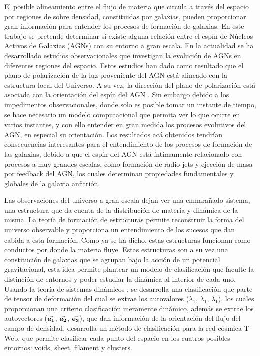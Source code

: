 El posible alineamiento entre el flujo de materia que circula a través del espacio por regiones de sobre densidad, constituidas por galaxias, pueden proporcionar gran información para entender los procesos de formación de galaxias. En este trabajo se pretende determinar si existe alguna relación entre el espín de Núcleos Activos de Galaxias (AGNs) con su entorno a gran escala. En la actualidad se ha desarrollado estudios observacionales que investigan la evolución de AGNs en diferentes regiones del espacio. Estos estudios han dado como resultado que el plano de polarización de la luz proveniente del AGN está alineado con la estructura local del Universo. A su vez, la dirección del plano de polarización está asociada con la orientación del espín del AGN \cite{hutsemekers2014}. Sin embargo debido a los impedimentos observacionales, donde solo es posible tomar un instante de tiempo, se hace necesario un modelo computacional que permita ver lo que ocurre en varios instantes, y con ello entender en gran medida los procesos evolutivos del AGN, en especial su orientación. Los resultados acá obtenidos tendrían consecuencias interesantes para el entendimiento de los procesos de formación de las galaxias, debido a que el espín del AGN está íntimamente relacionado con procesos a muy grandes escalas, como formación de radio jets y ejección de masa por feedback del AGN, los cuales determinan propiedades fundamentales y globales de la galaxia anfitrión. 


Las observaciones del universo a gran escala dejan ver una enmarañado sistema, una estructura que da cuenta de la distribución de materia y dinámica de la misma. La teoría de formación de estructuras \cite{zeldovich1970} permite reconstruir la forma del universo observable y proporciona un entendimiento de los sucesos que dan cabida a esta formación. Como ya se ha dicho, estas estructuras funcionan como conductos por donde la materia fluye. Estas estructuras son a su vez una constitución de galaxias que se agrupan bajo la acción de un potencial gravitacional, esta idea permite plantear un modelo de clasificación que faculte la distinción de entornos y poder estudiar la dinámica al interior de cada uno. Usando la teoría de sistemas dinámicos \cite{hahn2007}, se desarrolla una clasificación que parte de tensor de deformación del cual se extrae los autovalores ($\lambda_{1}, \, \lambda_{1}, \, \lambda_{1}$), los cuales proporcionan una criterio clasificación meramente dinámico, además se extrae los autovectores ($\vec{\bf{e_1}}$, $\vec{\bf{e_2}}$, $\vec{\bf{e_3}}$), que dan información de la orientación del flujo del campo de densidad. \cite{forero2009} desarrolla un método de clasificación para la red cósmica T-Web, que permite clasificar cada punto del espacio en los cuatros posibles entornos: voids, sheet, filament y clusters. 

